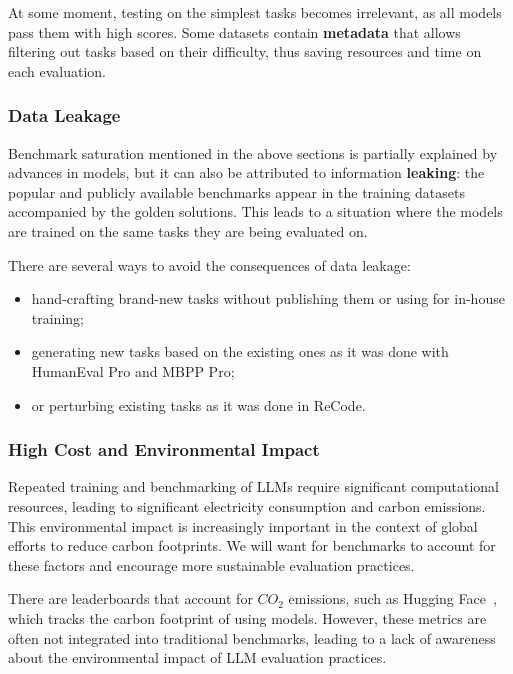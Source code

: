 At some moment, testing on the simplest tasks becomes irrelevant, as all models pass them with high scores.
Some datasets contain \textbf{metadata} that allows filtering out tasks based on their difficulty, thus saving resources and time on each evaluation.

\subsubsection{Data Leakage}

Benchmark saturation mentioned in the above sections is partially explained by advances in models, but it can also be attributed to information \textbf{leaking}: the popular and publicly available benchmarks appear in the training datasets accompanied by the golden solutions.
This leads to a situation where the models are trained on the same tasks they are being evaluated on.

There are several ways to avoid the consequences of data leakage:
\begin{itemize}
    \item hand-crafting brand-new tasks without publishing them or using for in-house training;
    \item generating new tasks based on the existing ones as it was done with HumanEval Pro and MBPP Pro;
    \item or perturbing existing tasks as it was done in ReCode.
\end{itemize}

\subsubsection{High Cost and Environmental Impact}

Repeated training and benchmarking of LLMs require significant computational resources, leading to significant electricity consumption and carbon emissions. This environmental impact is increasingly important in the context of global efforts to reduce carbon footprints.
We will want for benchmarks to account for these factors and encourage more sustainable evaluation practices.

There are leaderboards that account for $CO_2$ emissions, such as Hugging Face~\cite{huggingfaceCalculation}, which tracks the carbon footprint of using models. However, these metrics are often not integrated into traditional benchmarks, leading to a lack of awareness about the environmental impact of LLM evaluation practices.

